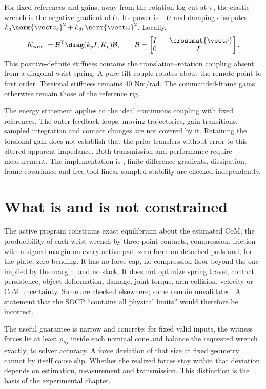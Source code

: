 For fixed references and gains, away from the rotation-log cut at $\pi$, the elastic wrench is the negative gradient of $U$. Its power is $-\dot U$ and damping dissipates $k_d\norm{\vect v_c}^2+k_{dr}\norm{\vect\omega}^2$. Locally,
\begin{equation}
K_{\mathrm{wrist}}=\mathcal B^\top
\diag(k_pI,K_r)\mathcal B,\qquad
\mathcal B=\begin{bmatrix}I&-\crossmat{\vect r}\\0&I\end{bmatrix}.
\end{equation}
This positive-definite stiffness contains the translation--rotation coupling absent from a diagonal wrist spring. A pure tilt couple rotates about the remote point to first order. Torsional stiffness remains $40$ Nm/rad. The commanded-frame gains otherwise remain those of the reference rig.

The energy statement applies to the ideal continuous coupling with fixed references. The outer feedback loops, moving trajectories, gain transitions, sampled integration and contact changes are not covered by it. Retaining the torsional gain does not establish that the prior transfers without error to this altered apparent impedance. Both transmission and performance require measurement. The implementation is ; finite-difference gradients, dissipation, frame covariance and free-tool linear sampled stability are checked independently.

\section{What is and is not constrained}

The active program constrains exact equilibrium about the estimated CoM, the producibility of each wrist wrench by three point contacts, compression, friction with a signed margin on every active pad, zero force on detached pads and, for the plate, zero bending. It has no force cap, no compression floor beyond the one implied by the margin, and no slack. It does not optimize spring travel, contact persistence, object deformation, damage, joint torque, arm collision, velocity or CoM uncertainty. Some are checked elsewhere; some remain unvalidated. A statement that the SOCP ``contains all physical limits'' would therefore be incorrect.

The useful guarantee is narrow and concrete: for fixed valid inputs, the witness forces lie at least $\rho_{hj}$ inside each nominal cone and balance the requested wrench exactly, to solver accuracy. A force deviation of that size at fixed geometry cannot by itself cause slip. Whether the realized forces stay within that deviation depends on estimation, measurement and transmission. This distinction is the basis of the experimental chapter.
